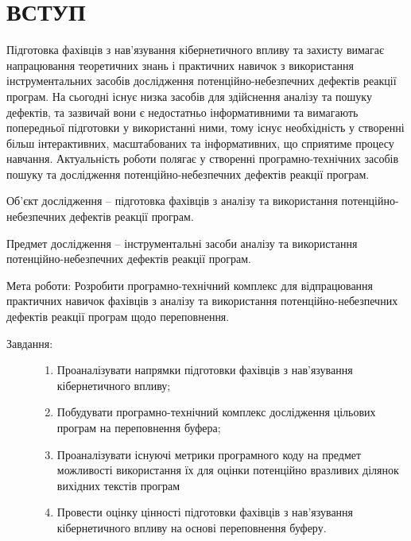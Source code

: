 \documentclass[oneside,final,14pt]{extreport}
\begin{document}
\chapter*{ВСТУП}
\label{1entrance::doc}\label{1entrance:id1}
Підготовка фахівців з нав’язування кібернетичного впливу та захисту вимагає напрацювання теоретичних знань і практичних навичок з використання інструментальних засобів дослідження потенційно-небезпечних дефектів реакції програм. На сьогодні існує низка засобів для здійснення аналізу та пошуку дефектів, та зазвичай вони є недостатньо інформативними та вимагають попередньої підготовки у використанні ними, тому існує необхідність у створенні більш інтерактивних, масштабованих та інформативних, що сприятиме процесу навчання. Актуальність роботи полягає у створенні програмно-технічних засобів пошуку та дослідження потенційно-небезпечних дефектів реакції програм.

Об’єкт дослідження – підготовка фахівців з аналізу та використання потенційно-небезпечних дефектів реакції програм.

Предмет дослідження – інструментальні засоби  аналізу та використання потенційно-небезпечних дефектів реакції програм.

Мета роботи: Розробити програмно-технічний комплекс для відпрацювання практичних навичок фахівців з аналізу та використання потенційно-небезпечних дефектів реакції програм щодо переповнення.
\begin{description}
\item[{Завдання:}] \leavevmode\begin{enumerate}
\item {} 
Проаналізувати напрямки підготовки фахівців з нав’язування кібернетичного впливу;

\item {} 
Побудувати програмно-технічний комплекс дослідження цільових програм на переповнення буфера;

\item {} 
Проаналізувати існуючі метрики програмного коду на предмет можливості використання їх для оцінки потенційно вразливих ділянок вихідних текстів програм

\item {} 
Провести оцінку цінності підготовки фахівців з нав’язування кібернетичного впливу на основі переповнення буферу.
\end{enumerate}
\end{description}
\pagebreak


\end{document}

